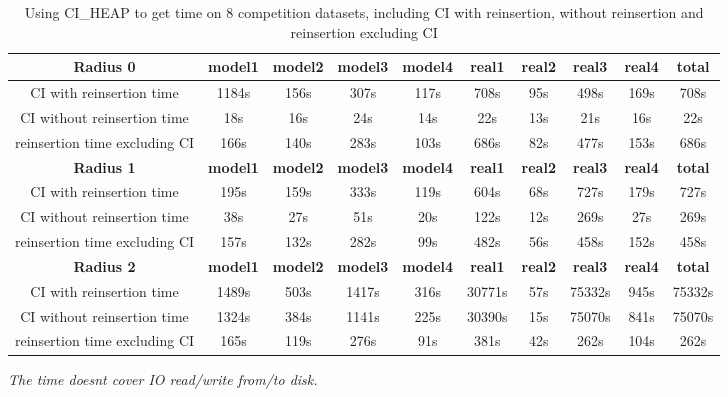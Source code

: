 \documentclass{article}
\begin{document}
	\begin{table}[]
	\begin{adjustwidth}{-2cm}{}		
		\begin{threeparttable}		
			\centering
			\caption{Using CI\_HEAP to get time on 8 competition datasets, including CI with reinsertion, without reinsertion and reinsertion excluding CI}
			\label{tab:table11}
			\begin{tabular}{|c|c|c|c|c|c|c|c|c|c|}
				\hline
				\textbf{Radius 0} & \textbf{model1} & \textbf{model2} & \textbf{model3} & \textbf{model4} & \textbf{real1} & \textbf{real2} & \textbf{real3} & \textbf{real4} & \textbf{total} \\ \hline
				
				CI with reinsertion time                 & 1184s&156s&307s&117s&708s&95s&498s&169s&708s         \\ \hline
				CI without reinsertion time                             & 18s&16s&24s&14s&22s&13s&21s&16s&22s            \\ \hline
				reinsertion time excluding CI                         & 166s&140s&283s&103s&686s&82s&477s&153s&686s               \\ \hline
				
				\textbf{Radius 1} & \textbf{model1} & \textbf{model2} & \textbf{model3} & \textbf{model4} & \textbf{real1} & \textbf{real2} & \textbf{real3} & \textbf{real4} & \textbf{total} \\ \hline
				
				CI with reinsertion time                 & 195s&159s&333s&119s&604s&68s&727s&179s&727s         \\ \hline
				CI without reinsertion time                             & 38s&27s&51s&20s&122s&12s&269s&27s&269s            \\ \hline
				reinsertion time excluding CI                         & 157s&132s&282s&99s&482s&56s&458s&152s&458s               \\ \hline					
				
				\textbf{Radius 2} & \textbf{model1} & \textbf{model2} & \textbf{model3} & \textbf{model4} & \textbf{real1} & \textbf{real2} & \textbf{real3} & \textbf{real4} & \textbf{total} \\ \hline
				CI with reinsertion time                 & 1489s&503s&1417s&316s&30771s&57s&75332s&945s&75332s         \\ \hline
				CI without reinsertion time                             & 1324s&384s&1141s&225s&30390s&15s&75070s&841s&75070s         \\ \hline
				reinsertion time excluding CI                         & 165s&119s&276s&91s&381s&42s&262s&104s&262s                \\ \hline				
			\end{tabular}
			\begin{tablenotes}
				\small
				\item\textit{ The time doesn\textquotesingle t cover IO read/write from/to disk.}
			\end{tablenotes}			
		\end{threeparttable}
	\end{adjustwidth}	
	\end{table}	
\end{document}
